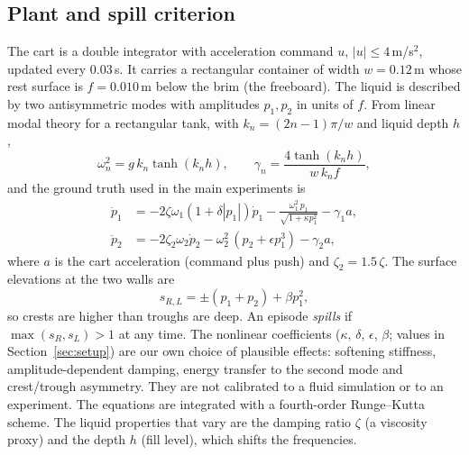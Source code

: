 \subsection{Plant and spill criterion}
The cart is a double integrator with acceleration command $u$, $|u|\le 4$\,m/s$^2$, updated every $0.03$\,s. It carries a rectangular container of width $w=0.12$\,m whose rest surface is $f=0.010$\,m below the brim (the freeboard). The liquid is described by two antisymmetric modes with amplitudes $p_1,p_2$ in units of $f$. From linear modal theory for a rectangular tank, with $k_n=(2n-1)\pi/w$ and liquid depth $h$,
\begin{equation}
\omega_n^2=g\,k_n\tanh(k_n h),\qquad \gamma_n=\frac{4\tanh(k_n h)}{w\,k_n f},
\end{equation}
and the ground truth used in the main experiments is
\begin{align}
\ddot p_1&=-2\zeta\omega_1(1+\delta|p_1|)\dot p_1-\frac{\omega_1^2\,p_1}{\sqrt{1+\kappa p_1^2}}-\gamma_1 a,\\
\ddot p_2&=-2\zeta_2\omega_2\dot p_2-\omega_2^2\,(p_2+\epsilon p_1^3)-\gamma_2 a,
\end{align}
where $a$ is the cart acceleration (command plus push) and $\zeta_2=1.5\,\zeta$. The surface elevations at the two walls are
\begin{equation}
s_{R,L}=\pm(p_1+p_2)+\beta p_1^2,
\end{equation}
so crests are higher than troughs are deep. An episode \emph{spills} if $\max(s_R,s_L)>1$ at any time. The nonlinear coefficients ($\kappa$, $\delta$, $\epsilon$, $\beta$; values in Section~\ref{sec:setup}) are our own choice of plausible effects: softening stiffness, amplitude-dependent damping, energy transfer to the second mode and crest/trough asymmetry. They are not calibrated to a fluid simulation or to an experiment. The equations are integrated with a fourth-order Runge--Kutta scheme. The liquid properties that vary are the damping ratio $\zeta$ (a viscosity proxy) and the depth $h$ (fill level), which shifts the frequencies.

